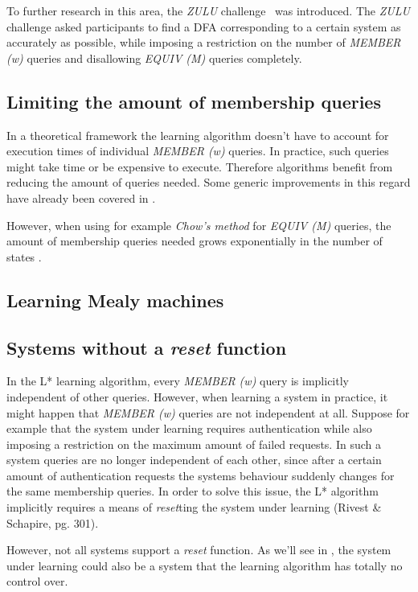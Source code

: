 \documentclass[multi,crop=false,class=article]{standalone}
\begin{document}
To further research in this area,
the \textit{ZULU} challenge~\cite{Combe10} was introduced.
The \textit{ZULU} challenge asked participants to find a DFA corresponding
to a certain system as accurately as possible, while imposing a restriction
on the number of \textit{MEMBER (w)} queries and disallowing \textit{EQUIV (M)}
queries completely.

\subsection{Limiting the amount of membership queries}
In a theoretical framework the learning algorithm doesn't have to account
for execution times of individual \textit{MEMBER (w)} queries.
In practice, such queries might take time or be expensive to execute.
Therefore algorithms benefit from reducing the amount of queries needed.
Some generic improvements in this regard have already been covered in
.

However, when using for example \textit{Chow's method} for \textit{EQUIV (M)}
queries, the amount of membership queries needed grows exponentially
in the number of states .


\subsection{Learning Mealy machines}

\subsection{Systems without a \textit{reset} function}
\label{sec:noreset}
In the L* learning algorithm, every \textit{MEMBER (w)} query is implicitly
independent of other queries.
However, when learning a system in practice, it might happen that
\textit{MEMBER (w)} queries are not independent at all.
Suppose for example that the system under learning requires authentication
while also imposing a restriction on the maximum amount of failed requests.
In such a system queries are no longer independent of each other,
since after a certain amount of authentication requests
the systems behaviour suddenly changes for the same membership queries.
In order to solve this issue, the L* algorithm implicitly requires a means
of \textit{reset}ting the system under learning (Rivest \& Schapire, pg. 301)\cite{Rivest93}.

However, not all systems support a \textit{reset} function.
As we'll see in , the system under learning
could also be a system that the learning algorithm has totally no control over.

\subsection{}
\end{document}
